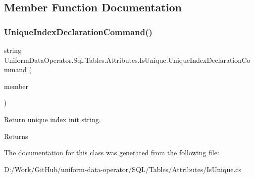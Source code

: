 \subsection{Member Function Documentation}
\mbox{\label{class_uniform_data_operator_1_1_sql_1_1_tables_1_1_attributes_1_1_is_unique_a5d1cafbf328813bbce6b514abb6cf08e}} 
\subsubsection{\texorpdfstring{Unique\+Index\+Declaration\+Command()}{UniqueIndexDeclarationCommand()}}
{\footnotesize\ttfamily string Uniform\+Data\+Operator.\+Sql.\+Tables.\+Attributes.\+Is\+Unique.\+Unique\+Index\+Declaration\+Command (\begin{DoxyParamCaption}\item[{Member\+Info}]{member }\end{DoxyParamCaption})}



Return unique index init string. 

\begin{DoxyReturn}{Returns}

\end{DoxyReturn}


The documentation for this class was generated from the following file\+:\begin{DoxyCompactItemize}
\item 
D\+:/\+Work/\+Git\+Hub/uniform-\/data-\/operator/\+S\+Q\+L/\+Tables/\+Attributes/Is\+Unique.\+cs\end{DoxyCompactItemize}
